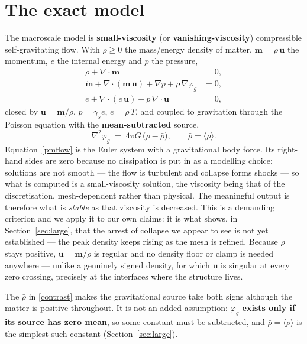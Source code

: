 \documentclass[11pt]{article}
\newcommand{\grad}{\nabla}
\begin{document}
\section{The exact model}\label{sec:model}
The macroscale model is \textbf{small-viscosity} (or \textbf{vanishing-viscosity}) compressible self-gravitating
flow. With $\rho\ge0$ the mass/energy density of matter, $\mathbf m=\rho\,\mathbf u$ the momentum, $e$ the internal
energy and $p$ the pressure,
\begin{equation}\label{pmflow}
\begin{aligned}
\dot\rho+\grad\!\cdot\mathbf m &= 0, \\
\dot{\mathbf m}+\grad\!\cdot(\mathbf m\,\mathbf u)+\grad p+\rho\,\grad\varphi_g &= 0,\\
\dot e+\grad\!\cdot(e\,\mathbf u)+p\,\grad\!\cdot\mathbf u &= 0,
\end{aligned}
\end{equation}
closed by $\mathbf u=\mathbf m/\rho$, $p=\gamma_s e$, $e=\rho\,T$, and coupled to gravitation through the Poisson
equation with the \textbf{mean-subtracted} source,
\begin{equation}\label{contrast}
\grad^2\varphi_g \;=\; 4\pi G\,\bigl(\rho-\bar\rho\bigr),
\qquad \bar\rho=\langle\rho\rangle .
\end{equation}
Equation~\eqref{pmflow} is the Euler system with a gravitational body force. Its right-hand sides are zero because
no dissipation is put in as a modelling choice; solutions are not smooth --- the flow is turbulent and collapse
forms shocks --- so what is computed is a small-viscosity solution, the viscosity being that of the discretisation,
mesh-dependent rather than physical. The meaningful output is therefore what is \emph{stable} as that viscosity is
decreased. This is a demanding criterion and we apply it to our own claims: it is what shows, in
Section~\ref{sec:large}, that the arrest of collapse we appear to see is not yet established --- the peak density
keeps rising as the mesh is refined. Because $\rho$ stays positive, $\mathbf u=\mathbf m/\rho$ is regular and no density
floor or clamp is needed anywhere --- unlike a genuinely signed density, for which $\mathbf u$ is singular at every
zero crossing, precisely at the interfaces where the structure lives.

The $\bar\rho$ in \eqref{contrast} makes the gravitational source take both signs although the matter is positive
throughout. It is not an added assumption: \textbf{$\varphi_g$ exists only if its source has zero mean}, so some
constant must be subtracted, and $\bar\rho=\langle\rho\rangle$ is the simplest such constant
(Section~\ref{sec:large}).
\end{document}
